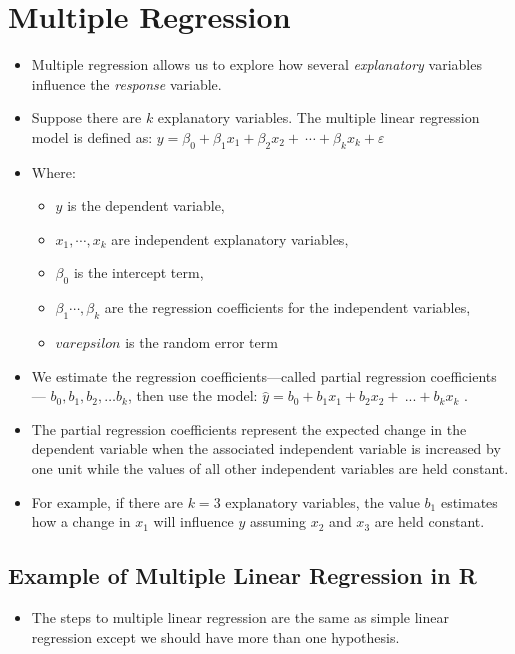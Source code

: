 \documentclass[
  letterpaper,
  DIV=11,
  numbers=noendperiod]{scrreprt}
\providecommand{\tightlist}{%
  \setlength{\itemsep}{0pt}\setlength{\parskip}{0pt}}\usepackage{longtable,booktabs,array}
\begin{document}
\chapter{Multiple Regression}\label{multiple-regression}

\begin{itemize}
\item
  Multiple regression allows us to explore how several
  \emph{explanatory} variables influence the \emph{response} variable.
\item
  Suppose there are \(k\) explanatory variables. The multiple linear
  regression model is defined as:
  \(y = \beta_0 + \beta_1x_1 + \beta_2x_2 + \ ⋯ + \beta_kx_k +\varepsilon\)
\item
  Where:

  \begin{itemize}
  \tightlist
  \item
    \(y\) is the dependent variable,
  \item
    \(x_1, ⋯, x_k\) are independent explanatory variables,
  \item
    \(\beta_0\) is the intercept term,
  \item
    \(\beta_1 ⋯, \beta_k\) are the regression coefficients for the
    independent variables,
  \item
    \(varepsilon\) is the random error term
  \end{itemize}
\item
  We estimate the regression coefficients---called partial regression
  coefficients --- \(b_0, b_1, b_2,… b_k\), then use the model:
  \(\hat{y} = b_0 + b_1x_1 + b_2x_2 + \ ... + b_kx_k\) .
\item
  The partial regression coefficients represent the expected change in
  the dependent variable when the associated independent variable is
  increased by one unit while the values of all other independent
  variables are held constant.
\item
  For example, if there are \(k = 3\) explanatory variables, the value
  \(b_1\) estimates how a change in \(x_1\) will influence \(y\)
  assuming \(x_2\) and \(x_3\) are held constant.
\end{itemize}

\section{Example of Multiple Linear Regression in
R}\label{example-of-multiple-linear-regression-in-r}

\begin{itemize}
\tightlist
\item
  The steps to multiple linear regression are the same as simple linear
  regression except we should have more than one hypothesis.
\end{itemize}
\end{document}
